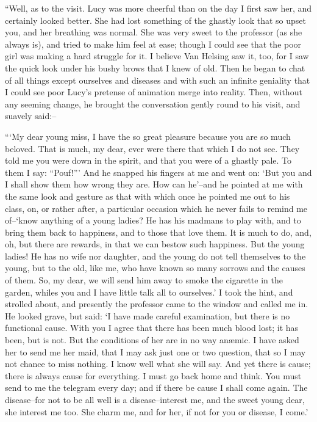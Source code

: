 \documentclass[12pt,openright]{book}
\begin{document}
“Well, as to the visit. Lucy was more cheerful than on the day I first saw her, and certainly looked better. She had lost something of the ghastly look that so upset you, and her breathing was normal. She was very sweet to the professor (as she always is), and tried to make him feel at ease; though I could see that the poor girl was making a hard struggle for it. I believe Van Helsing saw it, too, for I saw the quick look under his bushy brows that I knew of old. Then he began to chat of all things except ourselves and diseases and with such an infinite geniality that I could see poor Lucy’s pretense of animation merge into reality. Then, without any seeming change, he brought the conversation gently round to his visit, and suavely said:–

“‘My dear young miss, I have the so great pleasure because you are so much beloved. That is much, my dear, ever were there that which I do not see. They told me you were down in the spirit, and that you were of a ghastly pale. To them I say: “Pouf!”’ And he snapped his fingers at me and went on: ‘But you and I shall show them how wrong they are. How can he’–and he pointed at me with the same look and gesture as that with which once he pointed me out to his class, on, or rather after, a particular occasion which he never fails to remind me of–‘know anything of a young ladies? He has his madmans to play with, and to bring them back to happiness, and to those that love them. It is much to do, and, oh, but there are rewards, in that we can bestow such happiness. But the young ladies! He has no wife nor daughter, and the young do not tell themselves to the young, but to the old, like me, who have known so many sorrows and the causes of them. So, my dear, we will send him away to smoke the cigarette in the garden, whiles you and I have little talk all to ourselves.’ I took the hint, and strolled about, and presently the professor came to the window and called me in. He looked grave, but said: ‘I have made careful examination, but there is no functional cause. With you I agree that there has been much blood lost; it has been, but is not. But the conditions of her are in no way anæmic. I have asked her to send me her maid, that I may ask just one or two question, that so I may not chance to miss nothing. I know well what she will say. And yet there is cause; there is always cause for everything. I must go back home and think. You must send to me the telegram every day; and if there be cause I shall come again. The disease–for not to be all well is a disease–interest me, and the sweet young dear, she interest me too. She charm me, and for her, if not for you or disease, I come.’
\end{document}
